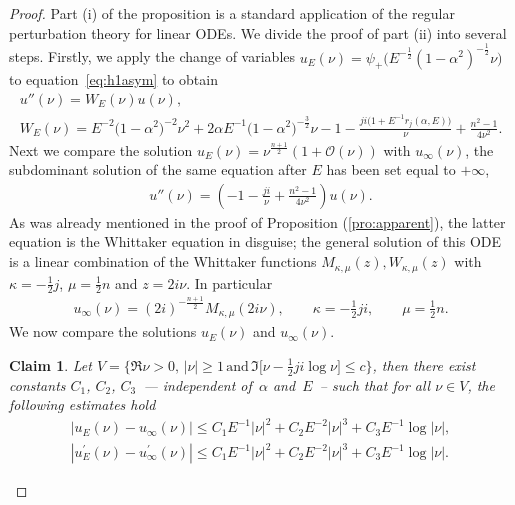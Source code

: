 \documentclass[pdftex]{sigma}
\numberwithin{equation}{section}
\newtheorem*{claim}{Claim}
\newcommand{\al}{\alpha}
\begin{document}
\begin{proof}	Part (i) of the proposition is a standard application of the regular perturbation theory for linear ODEs.	We divide the proof of part (ii) into several steps.	Firstly, we apply the change of variables $u_E(\nu)=\psi_+\big(E^{-\frac12}(1-\al^2)^{-\frac12} \nu\big)$ to equation~\eqref{eq:h1asym} to obtain
	\begin{gather*}%
	u''(\nu) =W_E(\nu) u(\nu) ,\\
	W_E(\nu) =E^{-2}\big(1-\al^2\big)^{-2}\nu^2+ 2 \al E^{-1}\big(1-\al^2\big)^{-\frac32}\nu- 1-\frac{j i \big(1+E^{-1} r_j(\al,E)\big)}{\nu}+\frac{n^2-1}{4 \nu^2}.\nonumber
	\end{gather*} Next we compare the solution $u_E(\nu)=\nu^{\frac{n+1}{2}}( 1+ \mathcal{O}(\nu) )$ with $u_{\infty}(\nu)$, the subdominant solution of the
	same equation after $E$ has been set equal to $+\infty$,
	\begin{gather}\label{eq:h1at0W}
	u''(\nu)= \left(- 1-\frac{j i }{\nu}+\frac{n^2-1}{4 \nu^2}\right) u(\nu) .
	\end{gather}
As was already mentioned in the proof of Proposition (\ref{pro:apparent}), the latter equation is the Whittaker equation in disguise; the general solution of this ODE is a linear combination of the Whittaker functions $M_{\kappa,\mu}(z),W_{\kappa,\mu}(z)$	with $\kappa=-\tfrac{1}{2} j$, $\mu=\tfrac{1}{2}n$ and $z= 2 i\nu$. In particular
	\begin{gather}\label{eq:uWhitaker}
	u_{\infty}(\nu)=(2i)^{-\frac{n+1}{2}} M_{\kappa,\mu}(2 i \nu) , \qquad \kappa=-\tfrac{1}{2}ji , \qquad \mu=\tfrac{1}{2}n .
	\end{gather}
	We now compare the solutions $u_E(\nu)$ and $u_{\infty}(\nu)$.
	\begin{claim}Let $V=\lbrace \Re \nu >0 , \, |\nu|\geq 1 \, \mbox{and} \, \Im\big[ \nu-\tfrac{1}{2}ji \log \nu \big]\leq c \rbrace$, then there exist constants $C_1$, $C_2$, $C_3$~--- independent of~$\al$ and~$E$~-- such that for all $\nu \in V$, the following estimates hold
		\begin{gather*}
		| u_{E}(\nu)-u_{\infty}(\nu) | \leq C_1 E^{-1} |\nu|^2 + C_2 E^{-2} |\nu|^3 + C_3 E^{-1} \log{|\nu|}, \\
		| u_{E}^{\prime}(\nu)-u_{\infty}^{\prime}(\nu)| \leq C_1 E^{-1} |\nu|^2 + C_2 E^{-2} |\nu|^3 + C_3 E^{-1} \log{|\nu|}.
		\end{gather*}
	\end{claim}
	

\end{proof}
\end{document}
